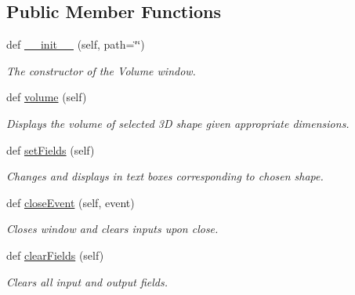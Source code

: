 \subsection*{Public Member Functions}
\begin{DoxyCompactItemize}
\item 
def \hyperlink{classvolume__ui_1_1_volume_window_ab2ab926742b93b5fc0030332e60d4bc7}{\+\_\+\+\_\+init\+\_\+\+\_\+} (self, path=\char`\"{}\char`\"{})
\begin{DoxyCompactList}\small\item\em The constructor of the Volume window. \end{DoxyCompactList}\item 
def \hyperlink{classvolume__ui_1_1_volume_window_a1b4cb7b0bd52c5898a39dbfb81e5cb85}{volume} (self)
\begin{DoxyCompactList}\small\item\em Displays the volume of selected 3D shape given appropriate dimensions. \end{DoxyCompactList}\item 
\mbox{\label{classvolume__ui_1_1_volume_window_a54f4caafa94056dcb90403c976c6d4b3}} 
def \hyperlink{classvolume__ui_1_1_volume_window_a54f4caafa94056dcb90403c976c6d4b3}{set\+Fields} (self)
\begin{DoxyCompactList}\small\item\em Changes and displays in text boxes corresponding to chosen shape. \end{DoxyCompactList}\item 
\mbox{\label{classvolume__ui_1_1_volume_window_ac1944f0385020e7c420f777d9c60b6df}} 
def \hyperlink{classvolume__ui_1_1_volume_window_ac1944f0385020e7c420f777d9c60b6df}{close\+Event} (self, event)
\begin{DoxyCompactList}\small\item\em Closes window and clears inputs upon close. \end{DoxyCompactList}\item 
\mbox{\label{classvolume__ui_1_1_volume_window_a6c2e9282cb113a4b635719d5e3b2e80a}} 
def \hyperlink{classvolume__ui_1_1_volume_window_a6c2e9282cb113a4b635719d5e3b2e80a}{clear\+Fields} (self)
\begin{DoxyCompactList}\small\item\em Clears all input and output fields. \end{DoxyCompactList}\end{DoxyCompactItemize}
